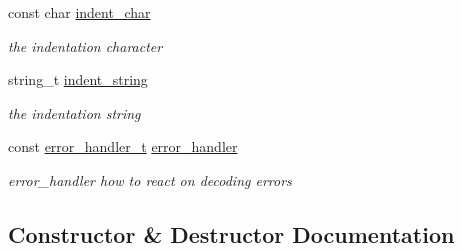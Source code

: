 \begin{DoxyCompactItemize}
\mbox{\label{classnlohmann_1_1detail_1_1serializer_a9a55e6b028d09676fe35aefa0c72ea5b}} 
const char \hyperlink{classnlohmann_1_1detail_1_1serializer_a9a55e6b028d09676fe35aefa0c72ea5b}{indent\+\_\+char}
\begin{DoxyCompactList}\small\item\em the indentation character \end{DoxyCompactList}\item 
\mbox{\label{classnlohmann_1_1detail_1_1serializer_ae9268a10d88a5526e32735a55a132fc6}} 
string\+\_\+t \hyperlink{classnlohmann_1_1detail_1_1serializer_ae9268a10d88a5526e32735a55a132fc6}{indent\+\_\+string}
\begin{DoxyCompactList}\small\item\em the indentation string \end{DoxyCompactList}\item 
\mbox{\label{classnlohmann_1_1detail_1_1serializer_a09d5a046fb0f7cb61977d6e5fbe8b3a1}} 
const \hyperlink{namespacenlohmann_1_1detail_a5a76b60b26dc8c47256a996d18d967df}{error\+\_\+handler\+\_\+t} \hyperlink{classnlohmann_1_1detail_1_1serializer_a09d5a046fb0f7cb61977d6e5fbe8b3a1}{error\+\_\+handler}
\begin{DoxyCompactList}\small\item\em error\+\_\+handler how to react on decoding errors \end{DoxyCompactList}\end{DoxyCompactItemize}


\subsection{Constructor \& Destructor Documentation}
\mbox{\label{classnlohmann_1_1detail_1_1serializer_ac010525281d97867ee842da37294fe83}} 
